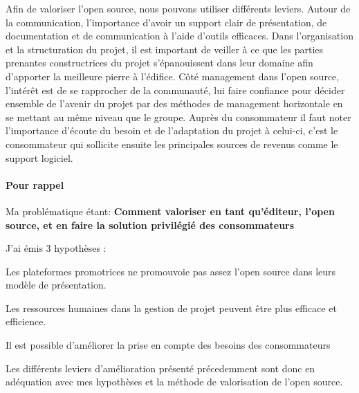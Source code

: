 		Afin de valoriser l'open source, nous pouvons utiliser différents leviers. 
		Autour de la communication, l'importance d'avoir un support clair de présentation, de documentation et de communication à l'aide d'outils efficaces.
		Dans l'organisation et la structuration du projet, il est important de veiller à ce que les parties prenantes constructrices du projet s'épanouissent dans leur domaine afin d'apporter la meilleure pierre à l'édifice. Côté management dans l'open source, l'intérêt est de se rapprocher de la communauté, lui faire confiance pour décider ensemble de l'avenir du projet par des méthodes de management horizontale en se mettant au même niveau que le groupe. Auprès du consommateur il faut noter l'importance d'écoute du besoin et de l'adaptation du projet à celui-ci, c'est le consommateur qui sollicite ensuite les principales sources de revenus comme le support logiciel.

	\paragraph{Pour rappel\\}

	Ma problématique étant: 
	\textbf{Comment valoriser en tant qu'éditeur, l'open source, et en faire la solution privilégié des consommateurs}

	J'ai émis 3 hypothèses : 

	\begin{description}[font=\color{burntorange}]
	\item[Plateformes promotrice: ] Les plateformes promotrices ne promouvoie pas assez l'open source dans leurs modèle de présentation.
	\item[Optimisation des ressources: ] Les ressources humaines dans la gestion de projet peuvent être plus efficace et efficience.
	\item[Besoin des consommateurs: ] Il est possible d'améliorer la prise en compte des besoins des consommateurs
	\end{description}

	Les différents leviers d'amélioration présenté précedemment sont donc en adéquation avec mes hypothèses et la méthode de valorisation de l'open source.
